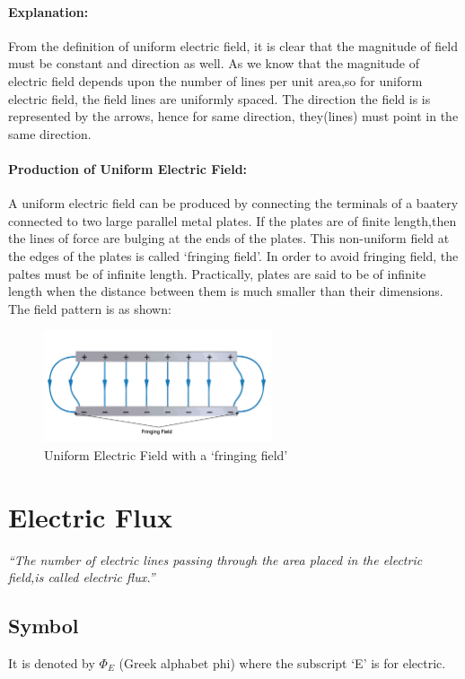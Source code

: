 \paragraph{Explanation:}
From the definition of uniform electric field, it is clear
that the magnitude of field must be constant and direction as well.
As we know that the magnitude of electric field depends upon the number
of lines per unit area,so for uniform electric field, the field lines
are uniformly spaced. The direction the field is is represented by the
arrows, hence for same direction,
they(lines) must point in the same direction.
\paragraph{Production of Uniform Electric Field:}
A uniform electric field can be produced by connecting the
terminals of a baatery connected to two large parallel metal plates.
If the plates are of finite length,then the lines of force are bulging
at the ends of the plates. This non-uniform field at the edges
of the plates is called ‘fringing field’. In order to avoid fringing field,
the paltes must be of infinite length. Practically, plates are said to
be of infinite length when the distance between them is much smaller than
their dimensions. The field pattern is as shown:

\begin{figure}[H]
  \centering
  \includegraphics[width=0.6\textwidth]{Images/11.8.png}
  \caption{Uniform Electric Field with a `fringing field'}
  \label{fig:11.8}
\end{figure}

\section{Electric Flux}
\textit{“The number of electric lines passing through the area placed in the electric field,is called electric flux.”}
\subsection*{Symbol}
It is denoted by $\Phi_{E}$ (Greek alphabet phi) where the subscript ‘E’ is for electric.
